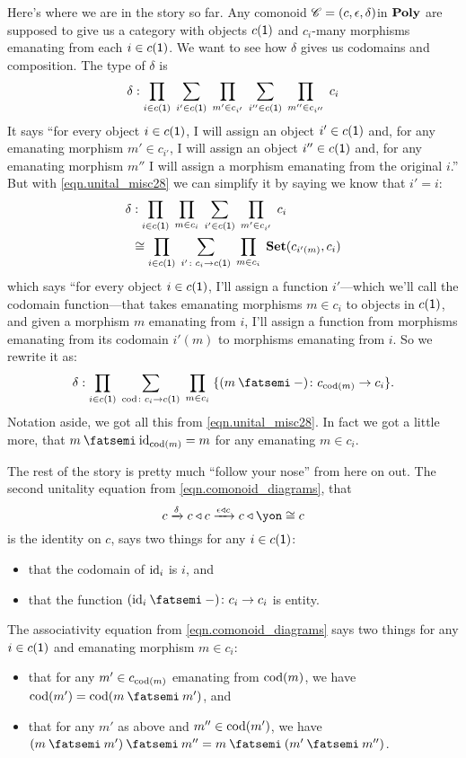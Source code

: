 \documentclass[DynamicalBook]{subfiles}
\begin{document}
Here's where we are in the story so far. Any comonoid $\mathscr{C}=(c,\epsilon,\delta)$in $\textbf{Poly}$ are supposed to give us a category with objects $c(\textsf{1})$ and $c_i$-many morphisms emanating from each $i\in c(\textsf{1})$. We want to see how $\delta$ gives us codomains and composition. The type of $\delta$ is
\[
\delta:\prod_{i\in c(\textsf{1})}\;\sum_{i'\in c(\textsf{1})}\;\prod_{m'\in c_{i'}}\;\sum_{i''\in c(\textsf{1})}\;\prod_{m''\in c_{i''}}\;c_i
\]
It says ``for every object $i\in c(\textsf{1})$, I will assign an object $i'\in c(\textsf{1})$ and, for any emanating morphism $m'\in c_{i'}$, I will assign an object $i''\in c(\textsf{1})$ and, for any emanating morphism $m''$ I will assign a morphism emanating from the original $i$.'' But with \eqref{eqn.unital_misc28} we can simplify it by saying we know that $i'=i$:
\begin{align*}
  \delta&:
  \prod_{i\in c(\textsf{1})}\;\prod_{m\in c_i}\;\sum_{i'\in c(\textsf{1})}\;\prod_{m'\in c_{i'}}\;c_i\\&\cong
	\prod_{i\in c(\textsf{1})}\;\sum_{i'\colon c_i\to c(\textsf{1})}\;\prod_{m\in c_i}\;\textbf{Set}(c_{i'(m)},c_i)
\end{align*}
which says ``for every object $i\in c(\textsf{1})$, I'll assign a function $i'$---which we'll call the codomain function---that takes emanating morphisms $m\in c_i$ to objects in $c(\textsf{1})$, and given a morphism $m$ emanating from $i$, I'll assign a function from morphisms emanating from its codomain $i'(m)$ to morphisms emanating from $i$. So we rewrite it as:
\[
\delta:	\prod_{i\in c(\1)}\;\sum_{\cod\colon c_i\to c(\1)}\;\prod_{m\in c_i}\;\{(m\then -)\colon c_{\cod(m)}\to c_i\}.
\]
Notation aside, we got all this from \eqref{eqn.unital_misc28}. In fact we got a little more, that $m\then\id_{\cod(m)}=m$ for any emanating $m\in c_i$.

The rest of the story is pretty much ``follow your nose'' from here on out. The second unitality equation from \eqref{eqn.comonoid_diagrams}, that
\[c\To{\delta}c\tri c\To{\epsilon\tri c}c\tri\yon\cong c\]
is the identity on $c$, says two things for any $i\in c(\textsf{1})$:
\begin{itemize}
	\item that the codomain of $\mathrm{id}_i$ is $i$, and
	\item that the function $(\id_i\then-)\colon c_i\to c_i$ is entity.
\end{itemize}
The associativity equation from \eqref{eqn.comonoid_diagrams} says two things for any $i\in c(\textsf{1})$ and emanating morphism $m\in c_i$:
\begin{itemize}
	\item that for any $m'\in c_{\operatorname{cod}(m)}$ emanating from $\operatorname{cod}(m)$, we have $\cod(m')=\cod(m\then m')$, and
	\item that for any $m'$ as above and $m''\in\operatorname{cod}(m')$, we have $(m\then m')\then m''=m\then(m'\then m'')$.
\end{itemize}
\end{document}
